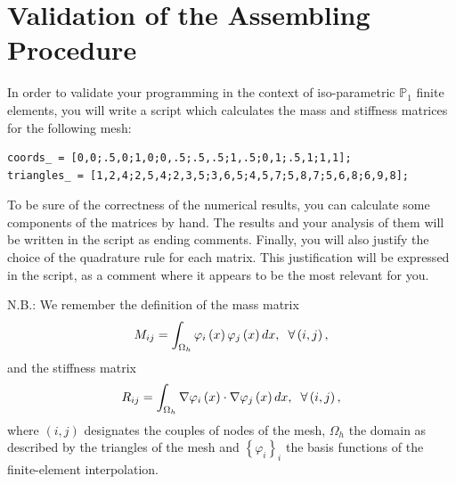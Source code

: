 \documentclass[11pt,a4paper,center,notitlepage]{article}
\numberwithin{equation}{section}
\begin{document}
\section{Validation of the Assembling Procedure}
In order to validate your programming in the context of iso-parametric $\mathbb{P}_1$ finite elements, you will write a script which calculates the mass and stiffness matrices for the following mesh:
\begin{verbatim}
coords_ = [0,0;.5,0;1,0;0,.5;.5,.5;1,.5;0,1;.5,1;1,1];
triangles_ = [1,2,4;2,5,4;2,3,5;3,6,5;4,5,7;5,8,7;5,6,8;6,9,8];
\end{verbatim}
To be sure of the correctness of the numerical results, you can calculate some components of the matrices by hand. The results and your analysis of them will be written in the script as ending comments. Finally, you will also justify the choice of the quadrature rule for each matrix. This justification will be expressed in the script, as a comment where it appears to be the most relevant for you.

N.B.: We remember the definition of the mass matrix 
\begin{align}
{M_{ij}} = \int_{{\Omega _h}} {{\varphi _i}\left( x \right){\varphi _j}\left( x \right)dx} ,\hspace{2mm} \forall \left( {i,j} \right),
\end{align}
and the stiffness matrix
\begin{align}
{R_{ij}} = \int_{{\Omega _h}} {\nabla {\varphi _i}\left( x \right) \cdot \nabla {\varphi _j}\left( x \right)dx} ,\hspace{2mm} \forall \left( {i,j} \right),
\end{align}
where $\left(i,j\right)$ designates the couples of nodes of the mesh, $\Omega _h$ the domain as described by the triangles of the mesh and ${\left\{ {{\varphi _i}} \right\}_i}$ the basis functions of the finite-element interpolation.
\end{document}
